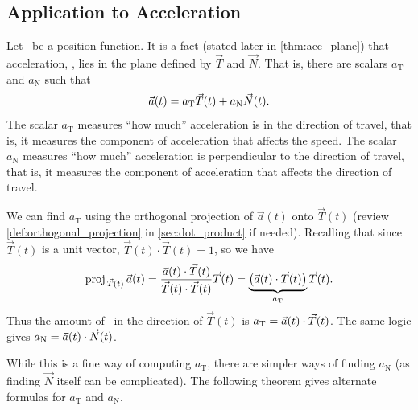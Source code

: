\subsection{Application to Acceleration}

Let \vrt\ be a position function. It is a fact (stated later in \autoref{thm:acc_plane}) %
 that acceleration, \vat, lies in the plane defined by $\vec T$ and $\vec N$. That is, there are scalars $a_{\mathrm{T}}$ and $a_{\mathrm{N}}$ such that 
\[\vat = a_{\mathrm{T}}\vec T(t) + a_{\mathrm{N}}\vec N(t).\]
The scalar $a_{\mathrm{T}}$ measures ``how much'' acceleration is in the direction of travel, that is, it measures the component of acceleration that affects the speed. The scalar $a_{\mathrm{N}}$ measures ``how much'' acceleration is perpendicular to the direction of travel, that is, it measures the component of acceleration that affects the direction of travel.

We can find $a_{\mathrm{T}}$ using the orthogonal projection of $\vec a(t)$ onto $\vec T(t)$ (review \autoref{def:orthogonal_projection} in \autoref{sec:dot_product} if needed).
Recalling that since $\vec T(t)$ is a unit vector, $\vec T(t)\cdot\vec T(t)=1$, so we have 
\[\proj{a(t)}{T(t)} = \frac{\vec a(t)\cdot\vec T(t)}{\vec T(t)\cdot\vec T(t)}\vec T(t) = \underbrace{\bigl(\vec a(t)\cdot\vec T(t)\bigr)}_{a_{\mathrm{T}}}\vec T(t).\]
Thus the amount of \vat\ in the direction of $\vec T(t)$ is $a_{\mathrm{T}}=\vat\cdot\vec T(t)$. The same logic gives $a_{\mathrm{N}} = \vat\cdot\vec N(t)$.

While this is a fine way of computing $a_{\mathrm{T}}$, there are simpler ways of finding $a_{\mathrm{N}}$ (as finding $\vec N$ itself can be complicated). The following theorem gives alternate formulas for $a_{\mathrm{T}}$ and $a_{\mathrm{N}}$.


